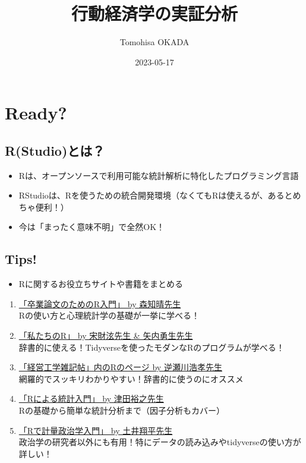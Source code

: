 \documentclass[
]{book}
\title{行動経済学の実証分析}
\author{Tomohisa OKADA}
\date{2023-05-17}
\providecommand{\tightlist}{%
  \setlength{\itemsep}{0pt}\setlength{\parskip}{0pt}}
\begin{document}
\maketitle

{
\setcounter{tocdepth}{1}
\tableofcontents
}
\hypertarget{ready}{%
\chapter{Ready?}\label{ready}}

\hypertarget{rstudioux3068ux306f}{%
\section{R(Studio)とは？}\label{rstudioux3068ux306f}}

\begin{itemize}
\tightlist
\item
  Rは、オープンソースで利用可能な統計解析に特化したプログラミング言語
\item
  RStudioは、Rを使うための統合開発環境（なくてもRは使えるが、あるとめちゃ便利！）\\
\item
  今は「まったく意味不明」で全然OK！
\end{itemize}

\hypertarget{tips}{%
\section{Tips!}\label{tips}}

\begin{itemize}
\tightlist
\item
  Rに関するお役立ちサイトや書籍をまとめる
\end{itemize}

\begin{enumerate}
\def\labelenumi{\arabic{enumi}.}
\item
  \href{https://tomoecon.github.io/R_for_graduate_thesis/}{「卒業論文のためのR入門」 by 森知晴先生}\\
  Rの使い方と心理統計学の基礎が一挙に学べる！
\item
  \href{https://www.jaysong.net/RBook/datahandling1.html}{「私たちのR」 by 宋財泫先生 \& 矢内勇生先生}\\
  辞書的に使える！Tidyverseを使ったモダンなRのプログラムが学べる！
\item
  \href{http://www.f.waseda.jp/sakas/R/index.html}{「経営工学雑記帖」内のRのページ by 逆瀬川浩孝先生}\\
  網羅的でスッキリわかりやすい！辞書的に使うのにオススメ
\item
  \href{https://htsuda.net/stats/}{「Rによる統計入門」 by 津田裕之先生}\\
  Rの基礎から簡単な統計分析まで（因子分析もカバー）
\item
  \href{https://shohei-doi.github.io/quant_polisci/index.html}{「Rで計量政治学入門」 by 土井翔平先生}\\
  政治学の研究者以外にも有用！特にデータの読み込みやtidyverseの使い方が詳しい！
\end{enumerate}
\end{document}
